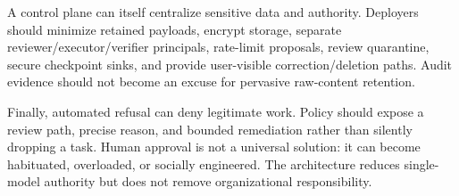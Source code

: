 A control plane can itself centralize sensitive data and authority. Deployers should minimize retained payloads, encrypt storage, separate reviewer/executor/verifier principals, rate-limit proposals, review quarantine, secure checkpoint sinks, and provide user-visible correction/deletion paths. Audit evidence should not become an excuse for pervasive raw-content retention.

Finally, automated refusal can deny legitimate work. Policy should expose a review path, precise reason, and bounded remediation rather than silently dropping a task. Human approval is not a universal solution: it can become habituated, overloaded, or socially engineered. The architecture reduces single-model authority but does not remove organizational responsibility.
